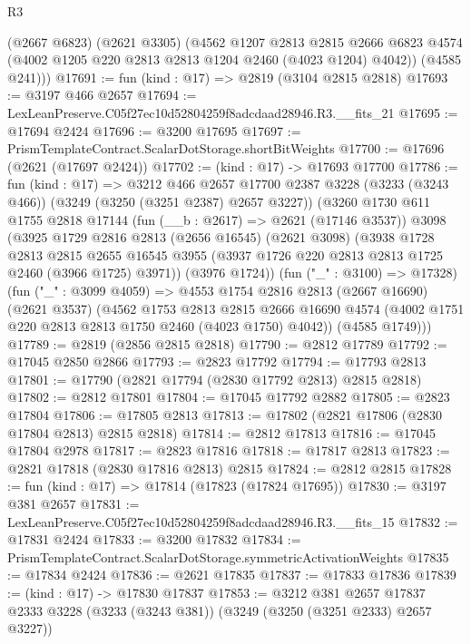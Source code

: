 \begin{lexlean}{R3}
\begin{coremodule}
        (@2667 @6823)
        (@2621 @3305)
        (@4562
          @1207
          @2813
          @2815
          @2666
          @6823
          @4574
          (@4002 @1205 @220 @2813 @2813 @1204 @2460 (@4023 @1204) @4042))
        (@4585 @241)))
@17691 := fun (kind : @17) => @2819 (@3104 @2815 @2818)
@17693 := @3197 @466 @2657
@17694 := LexLeanPreserve.C05f27ec10d52804259f8adcdaad28946.R3.__fits_21
@17695 := @17694 @2424
@17696 := @3200 @17695
@17697 := PrismTemplateContract.ScalarDotStorage.shortBitWeights
@17700 := @17696 (@2621 (@17697 @2424))
@17702 := (kind : @17) -> @17693 @17700
@17786 := fun (kind : @17) =>
  @3212
    @466
    @2657
    @17700
    @2387
    @3228
    (@3233 (@3243 @466))
    (@3249 (@3250 (@3251 @2387) @2657 @3227))
    (@3260
      @1730
      @611
      @1755
      @2818
      @17144
      (fun (__b : @2617) => @2621 (@17146 @3537))
      @3098
      (@3925
        @1729
        @2816
        @2813
        (@2656 @16545)
        (@2621 @3098)
        (@3938
          @1728
          @2813
          @2815
          @2655
          @16545
          @3955
          (@3937 @1726 @220 @2813 @2813 @1725 @2460 (@3966 @1725) @3971))
        (@3976 @1724))
      (fun ("_" : @3100) => @17328)
      (fun ("_" : @3099 @4059) =>
      @4553
        @1754
        @2816
        @2813
        (@2667 @16690)
        (@2621 @3537)
        (@4562
          @1753
          @2813
          @2815
          @2666
          @16690
          @4574
          (@4002 @1751 @220 @2813 @2813 @1750 @2460 (@4023 @1750) @4042))
        (@4585 @1749)))
@17789 := @2819 (@2856 @2815 @2818)
@17790 := @2812 @17789
@17792 := @17045 @2850 @2866
@17793 := @2823 @17792
@17794 := @17793 @2813
@17801 := @17790 (@2821 @17794 (@2830 @17792 @2813) @2815 @2818)
@17802 := @2812 @17801
@17804 := @17045 @17792 @2882
@17805 := @2823 @17804
@17806 := @17805 @2813
@17813 := @17802 (@2821 @17806 (@2830 @17804 @2813) @2815 @2818)
@17814 := @2812 @17813
@17816 := @17045 @17804 @2978
@17817 := @2823 @17816
@17818 := @17817 @2813
@17823 := @2821 @17818 (@2830 @17816 @2813) @2815
@17824 := @2812 @2815
@17828 := fun (kind : @17) => @17814 (@17823 (@17824 @17695))
@17830 := @3197 @381 @2657
@17831 := LexLeanPreserve.C05f27ec10d52804259f8adcdaad28946.R3.__fits_15
@17832 := @17831 @2424
@17833 := @3200 @17832
@17834 := PrismTemplateContract.ScalarDotStorage.symmetricActivationWeights
@17835 := @17834 @2424
@17836 := @2621 @17835
@17837 := @17833 @17836
@17839 := (kind : @17) -> @17830 @17837
@17853 := @3212
    @381
    @2657
    @17837
    @2333
    @3228
    (@3233 (@3243 @381))
    (@3249 (@3250 (@3251 @2333) @2657 @3227))

\end{coremodule}
\end{lexlean}
